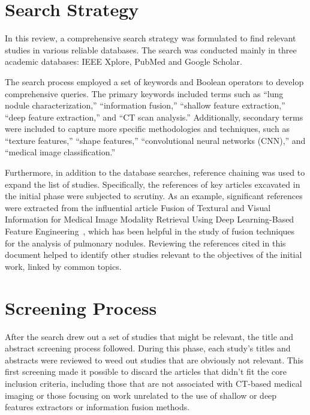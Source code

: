 \section{Search Strategy}

In this review, a comprehensive search strategy was formulated to find relevant studies in various reliable databases. The search was conducted mainly in three academic databases: IEEE Xplore, PubMed and Google Scholar.

The search process employed a set of keywords and Boolean operators to develop comprehensive queries. The primary keywords included terms such as “lung nodule characterization,” “information fusion,” “shallow feature extraction,” “deep feature extraction,” and “CT scan analysis.” Additionally, secondary terms were included to capture more specific methodologies and techniques, such as “texture features,” “shape features,” “convolutional neural networks (CNN),” and “medical image classification.”

Furthermore, in addition to the database searches, reference chaining was used to expand the list of studies. Specifically, the references of key articles excavated in the initial phase were subjected to scrutiny. As an example, significant references were extracted from the influential article Fusion of Textural and Visual Information for Medical Image Modality Retrieval Using Deep Learning-Based Feature Engineering~\cite{iqbal_fusion_2023}, which has been helpful in the study of fusion techniques for the analysis of pulmonary nodules. Reviewing the references cited in this document helped to identify other studies relevant to the objectives of the initial work, linked by common topics.



\section{Screening Process}

After the search drew out a set of studies that might be relevant, the title and abstract screening process followed. During this phase, each study's titles and abstracts were reviewed to weed out studies that are obviously not relevant. This first screening made it possible to discard the articles that didn't fit the core inclusion criteria, including those that are not associated with CT-based medical imaging or those focusing on work unrelated to the use of shallow or deep features extractors or information fusion methods.

